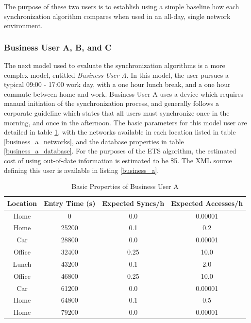 The purpose of these two users is to establish using a simple baseline how each synchronization algorithm compares when used in an all-day, single network environment.

\subsubsection{Business User A, B, and C}

The next model used to evaluate the synchronization algorithms is a more complex model, entitled \emph{Business User A}.  In this model, the user pursues a typical 09:00 - 17:00 work day, with a one hour lunch break, and a one hour commute between home and work.  Business User A uses a device which requires manual initiation of the synchronization process, and generally follows a corporate guideline which states that all users must synchronize once in the morning, and once in the afternoon.  The basic parameters for this model user are detailed in table \ref{business_a_properties}, with the networks available in each location listed in table \ref{business_a_networks}, and the database properties in table \ref{business_a_database}.  For the purposes of the ETS algorithm, the estimated cost of using out-of-date information is estimated to be \$5.  The XML source defining this user is available in listing \ref{business_a}.

\begin{table}[htdp]
\begin{center}
\begin{tabular}{|c|c|c|c|}
\hline
\textbf{Location} & \textbf{Entry Time (s)} & \textbf{Expected Syncs/h} & \textbf{Expected Accesses/h} \\
\hline
Home & 0 & 0.0 & 0.00001 \\
\hline
Home & 25200 & 0.1 & 0.2 \\
\hline
Car & 28800 & 0.0 & 0.00001 \\
\hline
Office & 32400 & 0.25 & 10.0 \\
\hline
Lunch & 43200 & 0.1 & 2.0 \\
\hline
Office & 46800 & 0.25 & 10.0 \\
\hline
Car & 61200 & 0.0 & 0.00001 \\
\hline
Home & 64800 & 0.1 & 0.5 \\
\hline
Home & 79200 & 0.0 & 0.00001 \\
\hline
\end{tabular}
\end{center}
\caption{Basic Properties of Business User A}
\label{business_a_properties}
\end{table}

